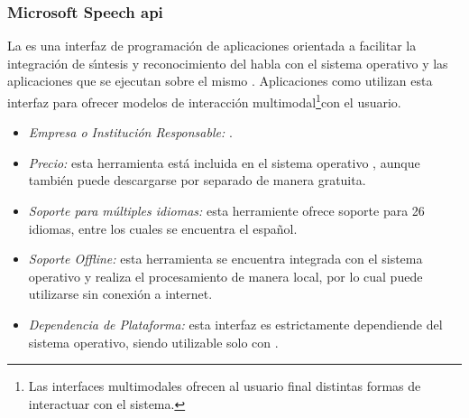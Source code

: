 \subsubsection{Microsoft Speech \gls{api}}
\label{sec:microsoft}

La  es una interfaz de programaci\'on de aplicaciones orientada a
facilitar la integraci\'on de s{\'\i}ntesis y reconocimiento del habla con el sistema operativo 
y las aplicaciones que se ejecutan sobre el mismo \cite{MicrosoftSpeech}. Aplicaciones como 
utilizan esta interfaz para ofrecer modelos de interacci\'on multimodal\footnote{Las interfaces multimodales
ofrecen al usuario final distintas formas de interactuar con el sistema.}con el usuario.

\begin{itemize}
	\item \emph{Empresa o Instituci\'on Responsable:} .
	\item \emph{Precio:} esta herramienta est\'a incluida en el sistema operativo , aunque
	tambi\'en puede descargarse por separado de manera gratuita.
	\item \emph{Soporte para m\'ultiples idiomas:} esta herramiente ofrece soporte para 26 idiomas,
	entre los cuales se encuentra el espa\~nol.
	\item \emph{Soporte Offline:} esta herramienta se encuentra integrada con el sistema operativo
	y realiza el procesamiento de manera local, por lo cual puede utilizarse sin conexi\'on a internet.
	\item \emph{Dependencia de Plataforma:} esta interfaz es estrictamente dependiende del sistema operativo,
	siendo utilizable solo con .
\end{itemize}
